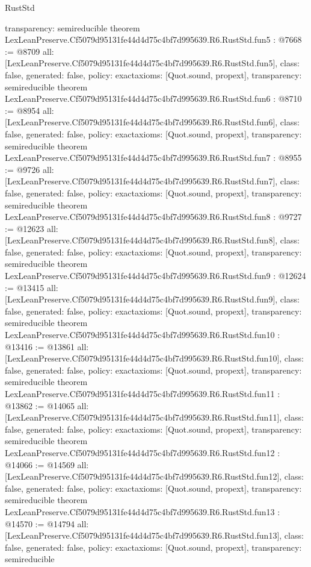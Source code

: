 \begin{lexlean}{RustStd}
\begin{coremodule}
{  transparency: semireducible
}
theorem LexLeanPreserve.Cf5079d95131fe44d4d75c4bf7d995639.R6.RustStd.fun5 : @7668 := @8709 {
  all: [LexLeanPreserve.Cf5079d95131fe44d4d75c4bf7d995639.R6.RustStd.fun5],
  class: false,
  generated: false,
  policy: exact{axioms: [Quot.sound, propext]},
  transparency: semireducible
}
theorem LexLeanPreserve.Cf5079d95131fe44d4d75c4bf7d995639.R6.RustStd.fun6 : @8710 := @8954 {
  all: [LexLeanPreserve.Cf5079d95131fe44d4d75c4bf7d995639.R6.RustStd.fun6],
  class: false,
  generated: false,
  policy: exact{axioms: [Quot.sound, propext]},
  transparency: semireducible
}
theorem LexLeanPreserve.Cf5079d95131fe44d4d75c4bf7d995639.R6.RustStd.fun7 : @8955 := @9726 {
  all: [LexLeanPreserve.Cf5079d95131fe44d4d75c4bf7d995639.R6.RustStd.fun7],
  class: false,
  generated: false,
  policy: exact{axioms: [Quot.sound, propext]},
  transparency: semireducible
}
theorem LexLeanPreserve.Cf5079d95131fe44d4d75c4bf7d995639.R6.RustStd.fun8 : @9727 := @12623 {
  all: [LexLeanPreserve.Cf5079d95131fe44d4d75c4bf7d995639.R6.RustStd.fun8],
  class: false,
  generated: false,
  policy: exact{axioms: [Quot.sound, propext]},
  transparency: semireducible
}
theorem LexLeanPreserve.Cf5079d95131fe44d4d75c4bf7d995639.R6.RustStd.fun9 : @12624 := @13415 {
  all: [LexLeanPreserve.Cf5079d95131fe44d4d75c4bf7d995639.R6.RustStd.fun9],
  class: false,
  generated: false,
  policy: exact{axioms: [Quot.sound, propext]},
  transparency: semireducible
}
theorem LexLeanPreserve.Cf5079d95131fe44d4d75c4bf7d995639.R6.RustStd.fun10 : @13416 := @13861 {
  all: [LexLeanPreserve.Cf5079d95131fe44d4d75c4bf7d995639.R6.RustStd.fun10],
  class: false,
  generated: false,
  policy: exact{axioms: [Quot.sound, propext]},
  transparency: semireducible
}
theorem LexLeanPreserve.Cf5079d95131fe44d4d75c4bf7d995639.R6.RustStd.fun11 : @13862 := @14065 {
  all: [LexLeanPreserve.Cf5079d95131fe44d4d75c4bf7d995639.R6.RustStd.fun11],
  class: false,
  generated: false,
  policy: exact{axioms: [Quot.sound, propext]},
  transparency: semireducible
}
theorem LexLeanPreserve.Cf5079d95131fe44d4d75c4bf7d995639.R6.RustStd.fun12 : @14066 := @14569 {
  all: [LexLeanPreserve.Cf5079d95131fe44d4d75c4bf7d995639.R6.RustStd.fun12],
  class: false,
  generated: false,
  policy: exact{axioms: [Quot.sound, propext]},
  transparency: semireducible
}
theorem LexLeanPreserve.Cf5079d95131fe44d4d75c4bf7d995639.R6.RustStd.fun13 : @14570 := @14794 {
  all: [LexLeanPreserve.Cf5079d95131fe44d4d75c4bf7d995639.R6.RustStd.fun13],
  class: false,
  generated: false,
  policy: exact{axioms: [Quot.sound, propext]},
  transparency: semireducible
}
\end{coremodule}
\end{lexlean}
